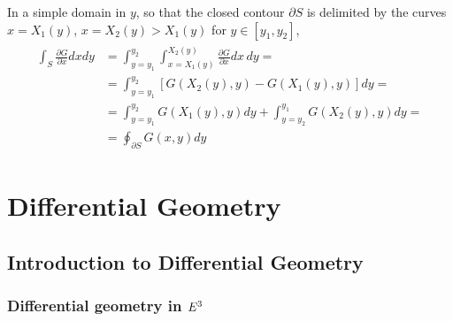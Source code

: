 \documentclass[letterpaper,10pt,english]{jupyterBook}
\begin{document}
\sphinxAtStartPar
In a simple domain in  \(y\), so that the closed contour \(\partial S\) is delimited by the curves \(x=X_1(y)\), \(x=X_2(y) > X_1(y)\) for \(y \in [y_1, y_2]\),
\begin{equation*}
\begin{split}\begin{aligned}
  \int_{S} \frac{\partial G}{\partial x} dx dy 
  & = \int_{y=y_1}^{y_2} \int_{x = X_1(y)}^{X_2(y)} \frac{\partial G}{\partial x} dx \, dy = \\
  & = \int_{y=y_1}^{y_2} \left[ G(X_2(y),y) - G(X_1(y),y) \right] dy = \\
  & = \int_{y=y_1}^{y_2} G(X_1(y),y) dy + \int_{y=y_2}^{y_1} G(X_2(y),y) dy = \\
  & = \oint_{\partial S} G(x,y) dy 
\end{aligned}\end{split}
\end{equation*}
\begin{sphinxVerbatim}[commandchars=\\\{\}]

\end{sphinxVerbatim}

\sphinxstepscope


\part{Differential Geometry}

\sphinxstepscope


\chapter{Introduction to Differential Geometry}
\label{\detokenize{ch/differential-geometry/intro:introduction-to-differential-geometry}}\label{\detokenize{ch/differential-geometry/intro:differential-geometry-intro}}\label{\detokenize{ch/differential-geometry/intro::doc}}

\section{Differential geometry in \protect\(E^3\protect\)}
\label{\detokenize{ch/differential-geometry/intro:differential-geometry-in-e-3}}
\end{document}

